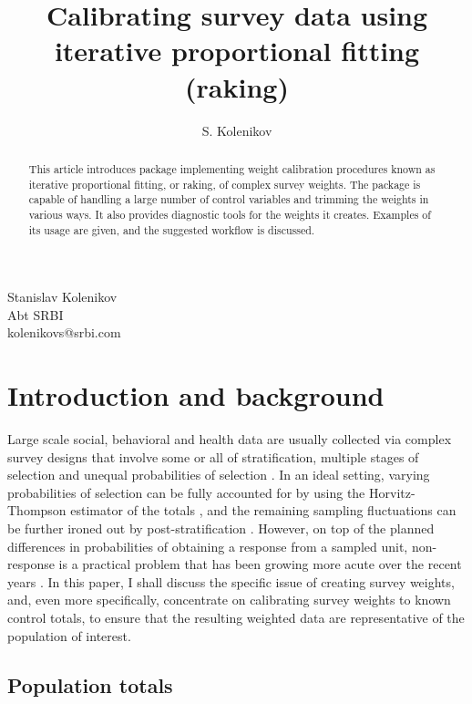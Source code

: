 \author{S. Kolenikov}{%
  Stanislav Kolenikov\\Abt SRBI\\kolenikovs@srbi.com
}
\title[Raking survey data]{Calibrating survey data using iterative proportional fitting (raking)}
\maketitle

\begin{abstract}
This article introduces package  implementing weight calibration
procedures known as iterative proportional fitting,
or raking, of complex survey weights.
The package is capable of handling a large number of control
variables and trimming the weights in various ways.
It also provides diagnostic tools for the weights it creates.
Examples of its usage are given,
and the suggested workflow is discussed.

\end{abstract}

\section{Introduction and background}

Large scale social, behavioral and health data are usually collected
via complex survey designs that involve some or all of stratification,
multiple stages of selection and unequal probabilities of selection
\citep{korn:graubard:1995,korn:graubard:1999}.
In an ideal setting, varying probabilities of selection can be fully
accounted for by using the Horvitz-Thompson estimator of the totals
\citep{horvitz:thompson:1952,thompson:1997}, and the remaining
sampling fluctuations can be further ironed out by
post-stratification \citep{holt:smith:1979}.
However, on top of the planned differences in probabilities of obtaining
a response from a sampled unit, non-response is a practical problem
that has been growing more acute over the recent years
\citep{groves:dillman:eltinge:little:2001,pew:2012}.
In this paper, I shall discuss the specific issue of creating
survey weights, and, even more specifically, concentrate on
calibrating survey weights to known control totals, to ensure
that the resulting weighted data are representative of the population
of interest.

\subsection{Population totals}


